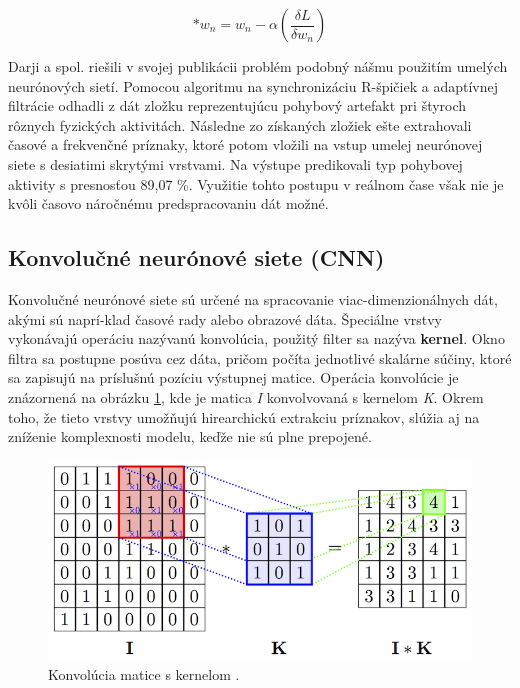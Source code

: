 \begin{equation} 
    \label{eq:5}
    *w_n = w_n - \alpha(\frac{\delta L}{\delta w_n})
\end{equation}

Darji a spol.\cite{Darji2013} riešili v svojej publikácii problém podobný nášmu použitím umelých neurónových sietí. Pomocou algoritmu na synchronizáciu R-špičiek a adaptívnej filtrácie odhadli z dát zložku reprezentujúcu pohybový artefakt pri štyroch rôznych fyzických aktivitách. Následne zo získaných zložiek ešte extrahovali časové a frekvenčné príznaky, ktoré potom vložili na vstup umelej neurónovej siete s desiatimi skrytými vrstvami. Na výstupe predikovali typ pohybovej aktivity s presnosťou 89,07 \%. Využitie tohto postupu v reálnom čase však nie je kvôli časovo náročnému predspracovaniu dát možné.

\subsection{Konvolučné neurónové siete (CNN)}

Konvolučné neurónové siete sú určené na spracovanie viac-dimenzionálnych dát, akými sú naprí-klad časové rady alebo obrazové dáta. Špeciálne vrstvy vykonávajú operáciu nazývanú konvolúcia, použitý filter sa nazýva \textbf{kernel}. Okno filtra sa postupne posúva cez dáta, pričom počíta jednotlivé skalárne súčiny, ktoré sa zapisujú na príslušnú pozíciu výstupnej matice. Operácia konvolúcie je znázornená na obrázku \ref{fig:convolution}, kde je matica \textit{I} konvolvovaná s kernelom \textit{K}. Okrem toho, že tieto vrstvy umožňujú hirearchickú extrakciu príznakov, slúžia aj na zníženie komplexnosti modelu, keďže nie sú plne prepojené.

\begin{figure}[H]
    \centering
    \includegraphics[scale=0.3]{img/convolution.png}
    \caption{Konvolúcia matice s kernelom \cite{mohamed2017}.}
    \label{fig:convolution}
\end{figure}

